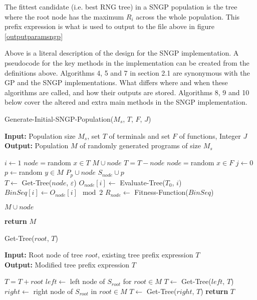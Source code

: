 \documentclass[a4paper,10.5pt]{article}
\begin{document}
The fittest candidate (i.e. best RNG tree) in a SNGP population is the tree where the root node has the maximum $R_i$ across the whole population. This prefix expression is what is used to output to the file above in figure \ref{outputparamsngp}

Above is a literal description of the design for the SNGP implementation. A pseudocode for the key methods in the implementation can be created from the definitions above. Algorithms  4, 5 and 7 in section 2.1 are synonymous with the GP and the SNGP implementations. What differs where and when these algorithms are called, and how their outputs are stored. Algorithms 8, 9 and 10 below cover the altered and extra main methods in the SNGP implementation.

\begin{algorithm}[H]
  \caption{Generate-Initial-SNGP-Population($M_{s}$, $T$, $F$, $J$)}
  \textbf{Input:} Population size $M_{s}$, set $T$ of terminals and set $F$ of functions, Integer $J$\\
  \textbf{Output:} Population $M$ of randomly generated programs of size $M_s$\\
  \begin{algorithmic}[1]
    \State $i \gets 1$
		\State $node = $random $x \in T$
		\State $M \cup node$ 
		\State $T = T - node$
	\Else
		\State $node = $random $ x \in F$
		\State $j \gets 0$
			 \State $p \gets $random $y \in M$
			 \State $P_p \cup node$
			 \State $S_{node} \cup p$
		\EndFor\\

		\State $T \gets $ Get-Tree($node$, $\varepsilon$)
			\State $O_{node}[i] \gets$ Evaluate-Tree($T_0$, $i$)
			\State $BinSeq[i] \gets O_{node}[i] \mod 2$
 		\EndFor
		\State $R_{node} \gets $ Fitness-Function($BinSeq$)
		
		\State $M \cup node$
	\EndIf

    \EndFor	
\State \textbf{return} $M$
  \end{algorithmic}
\end{algorithm}

\begin{algorithm}[H]
  \caption{Get-Tree($root$, $T$)}
  \textbf{Input:} Root node of tree $root$, existing tree prefix expression $T$\\ 
  \textbf{Output:} Modified tree prefix expression $T$\\

  \begin{algorithmic}[1]
   \State $T = T + root$
	\State $left \gets $ left node of $S_{root}$ for $root\in M$
	\State $T \gets $ Get-Tree($left$, $T$)
	\State $right \gets $ right node of $S_{root}$ in $root\in M$
	\State $T \gets $ Get-Tree($right$, $T$)
   \EndIf
\State \textbf{return} $T$
  \end{algorithmic}
\end{algorithm}
\end{document}
